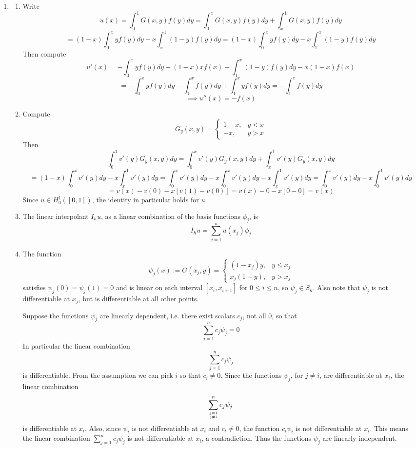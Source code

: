 \documentclass{article}
\newcommand{\imp}{\implies}
\begin{document}
\begin{enumerate}
\item

\begin{enumerate}
	
	
	\item Write
	$$u(x) = \int_0^1 G(x,y)f(y)dy
	= \int_0^x G(x,y)f(y)dy + \int_x^1 G(x,y)f(y)dy$$
	$$= (1-x)\int_0^x yf(y)dy + x\int_x^1 (1-y)f(y)dy
	= (1-x)\int_0^x yf(y)dy - x\int_1^x (1-y)f(y)dy$$
	Then compute
	$$u'(x) = -\int_0^x yf(y)dy + (1-x)xf(x) - \int_1^x (1-y)f(y)dy - x(1-x)f(x)$$
	$$= -\int_0^x yf(y)dy - \int_1^x f(y)dy + \int_1^x yf(y)dy
	= -\int_1^x f(y)dy$$
	$$\imp u''(x) = -f(x)$$
	
	
	\item Compute
	$$G_y(x,y) =
	\begin{cases}
		1-x, & y<x\\
		-x, & y>x
	\end{cases}$$
	Then
	$$\int_0^1 v'(y)G_y(x,y)dy = \int_0^x v'(y)G_y(x,y)dy + \int_x^1 v'(y)G_y(x,y)dy$$
	$$= (1-x)\int_0^x v'(y)dy - x\int_x^1 v'(y)dy
	= \int_0^x v'(y)dy - x\int_0^x v'(y)dy - x\int_x^1 v'(y)dy
	= \int_0^x v'(y)dy - x\int_0^1 v'(y)dy$$
	$$= v(x) - v(0) - x[v(1) - v(0)]
	= v(x) - 0 - x[0 - 0]
	= v(x)$$
	Since $u\in H^1_0([0,1])$, the identity in particular holds for $u$.
	
	
	\item The linear interpolant $I_hu$, as a linear combination of the basis functions $\phi_j$, is
	$$I_hu = \sum_{j=1}^n u(x_j)\phi_j$$
	
	
	\item The function
	$$\psi_j(x) := G(x_j,y) =
	\begin{cases}
		(1-x_j)y, & y\le x_j\\
		x_j(1-y), & y>x_j
	\end{cases}$$
	satisfies $\psi_j(0)=\psi_j(1)=0$ and is linear on each interval $[x_i,x_{i+1}]$ for $0\le i\le n$, so $\psi_j\in S_h$. Also note that $\psi_j$ is not differentiable at $x_j$, but is differentiable at all other points.
	
	Suppose the functions $\psi_j$ are linearly dependent, i.e. there exist scalars $c_j$, not all 0, so that
	$$\sum_{j=1}^nc_j\psi_j=0$$
	In particular the linear combination
	$$\sum_{j=1}^nc_j\psi_j$$
	is differentiable. From the assumption we can pick $i$ so that $c_i\ne0$. Since the functions $\psi_j$, for $j\ne i$, are differentiable at $x_i$, the linear combination
	$$\sum_{j=1 \atop j\ne i}^n c_j\psi_j$$
	is differentiable at $x_i$. Also, since $\psi_i$ is not differentiable at $x_i$ and $c_i\ne0$, the function $c_i\psi_i$ is not differentiable at $x_i$. This means the linear combination $\sum_{j=1}^nc_j\psi_j$ is not differentiable at $x_i$, a contradiction. Thus the functions $\psi_j$ are linearly independent.
	

\end{enumerate}
\end{enumerate}
\end{document}
